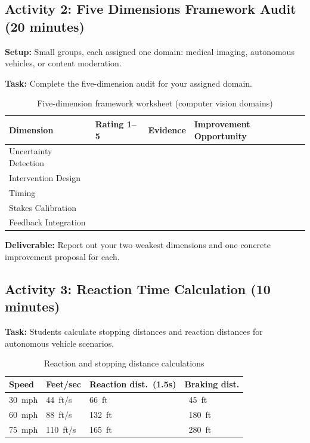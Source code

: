 \subsection{Activity 2: Five Dimensions Framework Audit (20 minutes)}

\textbf{Setup:} Small groups, each assigned one domain: medical imaging, autonomous vehicles, or content moderation.

\textbf{Task:} Complete the five-dimension audit for your assigned domain.

\begin{table}[htbp]
\caption{Five-dimension framework worksheet (computer vision domains)}
\label{tab:cv-five-dim}
\centering
\begin{tabular}{@{}p{3cm}p{1.5cm}p{3.5cm}p{3.5cm}@{}}
\toprule
\textbf{Dimension} & \textbf{Rating 1--5} & \textbf{Evidence} & \textbf{Improvement Opportunity} \\
\midrule
Uncertainty Detection & & & \\[8pt]
Intervention Design & & & \\[8pt]
Timing & & & \\[8pt]
Stakes Calibration & & & \\[8pt]
Feedback Integration & & & \\
\bottomrule
\end{tabular}
\end{table}

\textbf{Deliverable:} Report out your two weakest dimensions and one concrete improvement proposal for each.

\subsection{Activity 3: Reaction Time Calculation (10 minutes)}

\textbf{Task:} Students calculate stopping distances and reaction distances for autonomous vehicle scenarios.

\begin{table}[htbp]
\caption{Reaction and stopping distance calculations}
\label{tab:reaction-distances}
\centering
\begin{tabular}{@{}p{2.5cm}p{2.5cm}p{2.5cm}p{2.5cm}@{}}
\toprule
\textbf{Speed} & \textbf{Feet/sec} & \textbf{Reaction dist.\ (1.5s)} & \textbf{Braking dist.} \\
\midrule
30~mph & 44~ft/s & 66~ft & ~45~ft \\
60~mph & 88~ft/s & 132~ft & ~180~ft \\
75~mph & 110~ft/s & 165~ft & ~280~ft \\
\bottomrule
\end{tabular}
\end{table}

